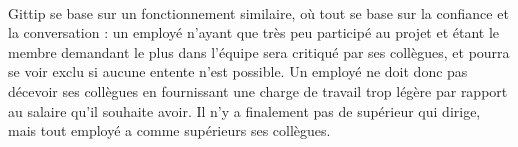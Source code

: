 \paragraph{}
Gittip se base sur un fonctionnement similaire, où tout se base sur la
confiance et la conversation : un employé n'ayant que très peu participé au
projet et étant le membre demandant le plus dans l'équipe sera critiqué par ses
collègues, et pourra se voir exclu si aucune entente n'est possible. Un employé
ne doit donc pas décevoir ses collègues en fournissant une charge de travail
trop légère par rapport au salaire qu'il souhaite avoir. Il n'y a
finalement pas de supérieur qui dirige, mais tout employé a comme supérieurs
ses collègues.
